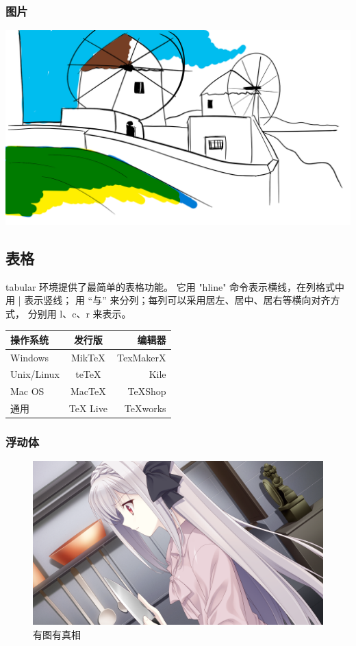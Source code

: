 \documentclass[UTF8]{article}
\begin{document}
     \subsubsection{图片}
         \includegraphics[width = .8\textwidth]{草图.png}
 \subsection{表格}
     tabular 环境提供了最简单的表格功能。
     它用 "hline" 命令表示横线，在列格式中用 | 表示竖线；
     用 “与” 来分列；每列可以采用居左、居中、居右等横向对齐方式，
     分别用 l、c、r 来表示。\\
     \begin{tabular}{|l|c|r|}
         \hline
         操作系统   & 发行版   & 编辑器    \\
         \hline
         Windows    & MikTeX   & TexMakerX \\
         \hline
         Unix/Linux & teTeX    & Kile      \\
         \hline
         Mac OS     & MacTeX   & TeXShop   \\
         \hline
         通用       & TeX Live & TeXworks  \\
         \hline
     \end{tabular}
     \subsubsection{浮动体}
         \begin{figure}[htbp]
             \centering
             \includegraphics[width = .8\textwidth]{lun02a.png}
             \caption{有图有真相}
             \label{fig:myphoto}
         \end{figure}
\end{document}
